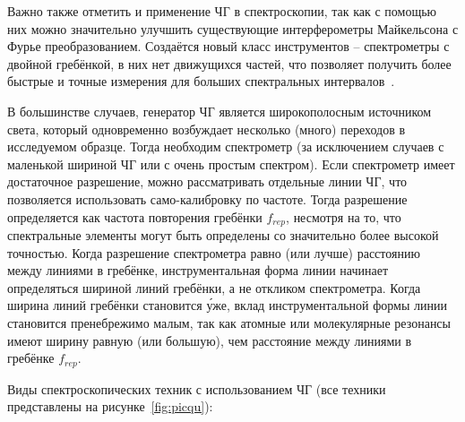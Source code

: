 Важно также отметить и применение ЧГ в спектроскопии, так как с помощью них можно значительно улучшить существующие интерферометры Майкельсона с Фурье преобразованием. Создаётся новый класс инструментов \--- спектрометры с двойной гребёнкой, в них нет движущихся частей, что позволяет получить более быстрые и точные измерения для больших спектральных интервалов~\cite{Picqu2019}.

В большинстве случаев, генератор ЧГ является широкополосным источником света, который одновременно возбуждает несколько (много) переходов в исследуемом образце. Тогда необходим спектрометр (за исключением случаев с маленькой шириной ЧГ или с очень простым спектром). Если спектрометр имеет достаточное разрешение, можно рассматривать отдельные линии ЧГ, что позволяется использовать само-калибровку по частоте. Тогда разрешение определяется как частота повторения гребёнки $f_{rep}$, несмотря на то, что спектральные элементы могут быть определены со значительно более высокой точностью. Когда разрешение спектрометра равно (или лучше) расстоянию между линиями в гребёнке, инструментальная форма линии начинает определяться шириной линий гребёнки, а не откликом спектрометра. Когда ширина линий гребёнки становится \'уже, вклад инструментальной формы линии становится пренебрежимо малым, так как атомные или молекулярные резонансы имеют ширину равную (или большую), чем расстояние между линиями в гребёнке $f_{rep}$. 

Виды спектроскопических техник с использованием ЧГ (все техники представлены на рисунке~\ref{fig:picqu}):

